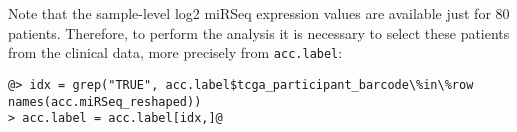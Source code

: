 \documentclass{TechReport}
\begin{document}
Note that the sample-level log2 miRSeq expression values are available just for 80 patients.
Therefore, to perform the analysis it is necessary to select these patients from the clinical data, 
more precisely from {\tt acc.label}:
\begin{lstlisting}[style=base]
@> idx = grep("TRUE", acc.label$tcga_participant_barcode\%in\%row
names(acc.miRSeq_reshaped))
> acc.label = acc.label[idx,]@
\end{lstlisting}





\ \\

\end{document}
